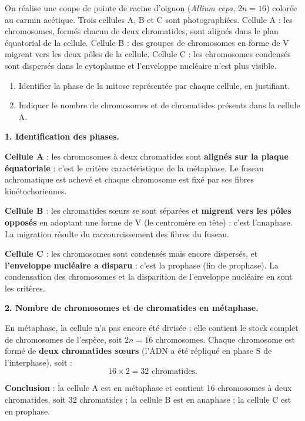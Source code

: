 \documentclass[11pt]{article}
\newcommand{\cle}[1]{{\popxbold\color{popdark}#1}}
\begin{document}
\begin{exoresolu}
On réalise une coupe de pointe de racine d'oignon (\emph{Allium cepa}, $2n = 16$) colorée au carmin acétique. Trois cellules A, B et C sont photographiées. Cellule A : les chromosomes, formés chacun de deux chromatides, sont alignés dans le plan équatorial de la cellule. Cellule B : des groupes de chromosomes en forme de V migrent vers les deux pôles de la cellule. Cellule C : les chromosomes condensés sont dispersés dans le cytoplasme et l'enveloppe nucléaire n'est plus visible.
\begin{enumerate}
\item Identifier la phase de la mitose représentée par chaque cellule, en justifiant.
\item Indiquer le nombre de chromosomes et de chromatides présents dans la cellule A.
\end{enumerate}
\tcblower
\textbf{1. Identification des phases.}

\textbf{Cellule A} : les chromosomes à deux chromatides sont \textbf{alignés sur la plaque équatoriale} : c'est le critère caractéristique de la \cle{métaphase}. Le fuseau achromatique est achevé et chaque chromosome est fixé par ses fibres kinétochoriennes.

\textbf{Cellule B} : les chromatides sœurs se sont séparées et \textbf{migrent vers les pôles opposés} en adoptant une forme de V (le centromère en tête) : c'est l'\cle{anaphase}. La migration résulte du raccourcissement des fibres du fuseau.

\textbf{Cellule C} : les chromosomes sont condensés mais encore dispersés, et \textbf{l'enveloppe nucléaire a disparu} : c'est la \cle{prophase} (fin de prophase). La condensation des chromosomes et la disparition de l'enveloppe nucléaire en sont les critères.

\textbf{2. Nombre de chromosomes et de chromatides en métaphase.}

En métaphase, la cellule n'a pas encore été divisée : elle contient le stock complet de chromosomes de l'espèce, soit $2n = 16$ chromosomes. Chaque chromosome est formé de \textbf{deux chromatides sœurs} (l'ADN a été répliqué en phase S de l'interphase), soit :
\[ 16 \times 2 = 32 \text{ chromatides.} \]

\textbf{Conclusion} : la cellule A est en métaphase et contient 16 chromosomes à deux chromatides, soit 32 chromatides ; la cellule B est en anaphase ; la cellule C est en prophase.
\end{exoresolu}
\end{document}
